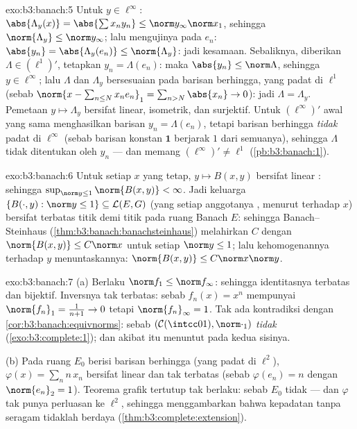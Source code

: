 \begin{solution}{exo:b3:banach:5}
Untuk $y \in \ell^\infty$: $\abs{\Lambda_y(x)} =
\abs{\sum x_ny_n} \leq \norm y_\infty\norm x_1$, sehingga
$\norm{\Lambda_y} \leq \norm y_\infty$; lalu mengujinya pada $e_n$:
$\abs{y_n} = \abs{\Lambda_y(e_n)} \leq \norm{\Lambda_y}$: jadi
kesamaan. Sebaliknya, diberikan $\Lambda \in (\ell^1)'$, tetapkan $y_n =
\Lambda(e_n)$: maka $\abs{y_n} \leq \norm\Lambda$, sehingga $y \in
\ell^\infty$; lalu $\Lambda$ dan $\Lambda_y$ bersesuaian pada barisan
berhingga, yang padat di $\ell^1$ (sebab $\norm{x - \sum_{n\leq
N}x_ne_n}_1 = \sum_{n>N}\abs{x_n} \to 0$): jadi $\Lambda =
\Lambda_y$. Pemetaan $y \mapsto \Lambda_y$ bersifat linear, isometrik,
dan surjektif. Untuk $(\ell^\infty)'$ awal yang sama menghasilkan barisan
$y_n = \Lambda(e_n)$, tetapi barisan berhingga \emph{tidak} padat
di $\ell^\infty$
(sebab barisan konstan $\mathbf 1$ berjarak $1$ dari semuanya),
sehingga $\Lambda$ tidak ditentukan oleh $y_n$ --- dan
memang $(\ell^\infty)' \neq \ell^1$
(\cref{pb:b3:banach:1}).
\end{solution}

\begin{solution}{exo:b3:banach:6}
Untuk setiap $x$ yang tetap, $y \mapsto B(x, y)$ bersifat linear :
sehingga $\sup_{\norm y \leq 1}\norm{B(x,y)} < \infty$. Jadi keluarga
$\{B(\cdot, y) : \norm y \leq 1\} \subseteq \mathcal L(E, G)$
(yang setiap anggotanya , menurut  terhadap $x$) bersifat terbatas
titik demi titik pada ruang Banach $E$: sehingga Banach--Steinhaus
(\cref{thm:b3:banach:banachsteinhaus}) melahirkan $C$ dengan
$\norm{B(x,y)} \leq C\norm x$ untuk setiap $\norm y \leq 1$;
lalu kehomogenannya terhadap $y$ menuntaskannya: $\norm{B(x,y)} \leq
C\norm x\norm y$.
\end{solution}

\begin{solution}{exo:b3:banach:7}
(a) Berlaku $\norm f_1 \leq \norm f_\infty$: sehingga identitasnya terbatas
dan bijektif. Inversnya tak terbatas: sebab $f_n(x) = x^n$ mempunyai
$\norm{f_n}_1 = \frac1{n+1} \to 0$ tetapi $\norm{f_n}_\infty = 1$.
Tak ada kontradiksi dengan \cref{cor:b3:banach:equivnorms}: sebab $(\mathcal
C(\intcc01), \norm\cdot_1)$ \emph{tidak} 
(\cref{exo:b3:complete:1}); dan akibat itu menuntut 
pada kedua sisinya.

(b) Pada ruang $E_0$ berisi barisan berhingga (yang padat di $\ell^2$),
$\varphi(x) = \sum_n n\,x_n$ bersifat linear dan tak terbatas
(sebab $\varphi(e_n) = n$ dengan $\norm{e_n}_2 = 1$). Teorema grafik
tertutup tak berlaku: sebab $E_0$ tidak  --- dan $\varphi$
tak punya perluasan  ke $\ell^2$, sehingga menggambarkan bahwa
kepadatan tanpa  seragam tidaklah berdaya
(\cref{thm:b3:complete:extension}).
\end{solution}


